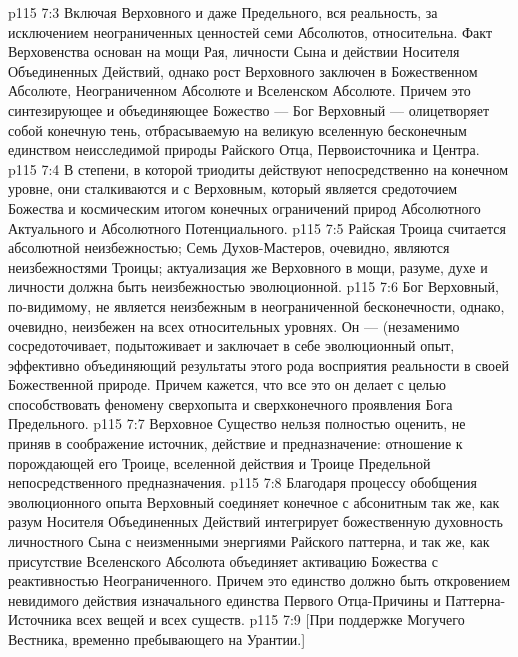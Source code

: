 \vs p115 7:3 \pc Включая Верховного и даже Предельного, вся реальность, за исключением неограниченных ценностей семи Абсолютов, относительна. Факт Верховенства основан на мощи Рая, личности Сына и действии Носителя Объединенных Действий, однако рост Верховного заключен в Божественном Абсолюте, Неограниченном Абсолюте и Вселенском Абсолюте. Причем это синтезирующее и объединяющее Божество --- Бог Верховный --- олицетворяет собой конечную тень, отбрасываемую на великую вселенную бесконечным единством неисследимой природы Райского Отца, Первоисточника и Центра.
\vs p115 7:4 В степени, в которой триодиты действуют непосредственно на конечном уровне, они сталкиваются и с Верховным, который является средоточием Божества и космическим итогом конечных ограничений природ Абсолютного Актуального и Абсолютного Потенциального.
\vs p115 7:5 \pc Райская Троица считается абсолютной неизбежностью; Семь Духов\hyp{}Мастеров, очевидно, являются неизбежностями Троицы; актуализация же Верховного в мощи, разуме, духе и личности должна быть неизбежностью эволюционной.
\vs p115 7:6 Бог Верховный, по\hyp{}видимому, не является неизбежным в неограниченной бесконечности, однако, очевидно, неизбежен на всех относительных уровнях. Он --- (незаменимо сосредоточивает, подытоживает и заключает в себе эволюционный опыт, эффективно объединяющий результаты этого рода восприятия реальности в своей Божественной природе. Причем кажется, что все это он делает с целью способствовать феномену  сверхопыта и сверхконечного проявления Бога Предельного.
\vs p115 7:7 Верховное Существо нельзя полностью оценить, не приняв в соображение источник, действие и предназначение: отношение к порождающей его Троице, вселенной действия и Троице Предельной непосредственного предназначения.
\vs p115 7:8 Благодаря процессу обобщения эволюционного опыта Верховный соединяет конечное с абсонитным так же, как разум Носителя Объединенных Действий интегрирует божественную духовность личностного Сына с неизменными энергиями Райского паттерна, и так же, как присутствие Вселенского Абсолюта объединяет активацию Божества с реактивностью Неограниченного. Причем это единство должно быть откровением невидимого действия изначального единства Первого Отца\hyp{}Причины и Паттерна\hyp{}Источника всех вещей и всех существ.
\vsetoff
\vs p115 7:9 [При поддержке Могучего Вестника, временно пребывающего на Урантии.]
